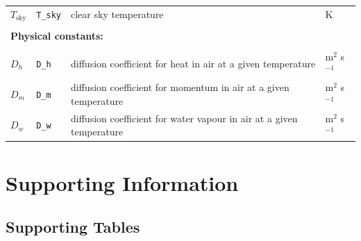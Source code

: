 \documentclass[11pt, oneside]{article}
\newcommand{\code}[1]{{\texttt{#1}}}
\begin{document}
\begin{table}[ht]
\begin{center}
{\begin{tabular}{llll}
  $T_\mathrm{sky}$ & \code{T\_sky}  & clear sky temperature & K \\
  \\
  \multicolumn{4}{l}{\textbf{Physical constants:}} \\
  \\
  $D_h$            & \code{D\_h}    & diffusion coefficient for heat in air at a given temperature & m$^2$ s$^{-1}$ \\
  $D_m$            & \code{D\_m}    & diffusion coefficient for momentum in air at a given temperature & m$^2$ s$^{-1}$ \\
  $D_w$            & \code{D\_w} & diffusion coefficient for water vapour in air at a given temperature        & m$^2$ s$^{-1}$ \\


\bottomrule

\end{tabular}}
\end{center}
\label{table:table_output}
\end{table}


\clearpage

\section*{Supporting Information}

\renewcommand\thefigure{S\arabic{figure}}
\renewcommand\thetable{S\arabic{table}}
\renewcommand\theequation{S\arabic{equation}}
\setcounter{table}{0}
\setcounter{equation}{0}
\setcounter{figure}{0}


\subsection*{Supporting Tables}
\end{document}
